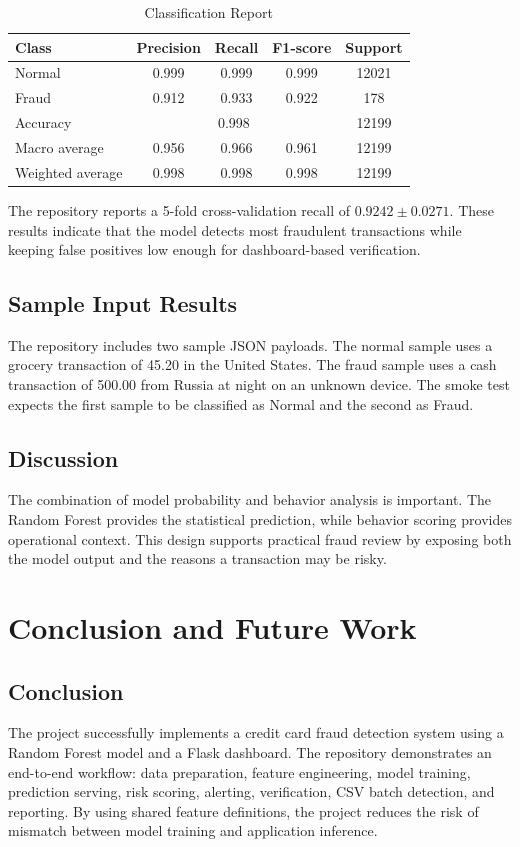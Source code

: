 \documentclass[12pt,a4paper]{report}
\begin{document}
\begin{table}[H]
\centering
\caption{Classification Report}
\begin{tabular}{lcccc}
\toprule
\textbf{Class} & \textbf{Precision} & \textbf{Recall} & \textbf{F1-score} & \textbf{Support} \\
\midrule
Normal & 0.999 & 0.999 & 0.999 & 12021 \\
Fraud & 0.912 & 0.933 & 0.922 & 178 \\
\midrule
Accuracy & \multicolumn{3}{c}{0.998} & 12199 \\
Macro average & 0.956 & 0.966 & 0.961 & 12199 \\
Weighted average & 0.998 & 0.998 & 0.998 & 12199 \\
\bottomrule
\end{tabular}
\end{table}

The repository reports a 5-fold cross-validation recall of \(0.9242 \pm 0.0271\). These results indicate that the model detects most fraudulent transactions while keeping false positives low enough for dashboard-based verification.

\section{Sample Input Results}
The repository includes two sample JSON payloads. The normal sample uses a grocery transaction of 45.20 in the United States. The fraud sample uses a cash transaction of 500.00 from Russia at night on an unknown device. The smoke test expects the first sample to be classified as Normal and the second as Fraud.

\section{Discussion}
The combination of model probability and behavior analysis is important. The Random Forest provides the statistical prediction, while behavior scoring provides operational context. This design supports practical fraud review by exposing both the model output and the reasons a transaction may be risky.

\chapter{Conclusion and Future Work}

\section{Conclusion}
The project successfully implements a credit card fraud detection system using a Random Forest model and a Flask dashboard. The repository demonstrates an end-to-end workflow: data preparation, feature engineering, model training, prediction serving, risk scoring, alerting, verification, CSV batch detection, and reporting. By using shared feature definitions, the project reduces the risk of mismatch between model training and application inference.
\end{document}
